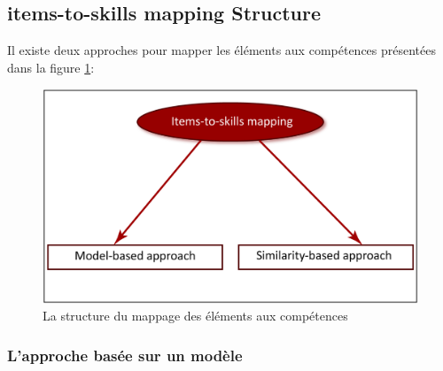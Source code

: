 \subsection{items-to-skills mapping Structure}
Il existe deux approches pour mapper les éléments aux compétences présentées dans la figure \ref{items_to_skills_mapping}:

\begin{figure}[H]
	\begin{center}
		\includegraphics[scale=0.2]{images/chapitre3/Items_mapping_structure.png}
	\end{center}
\caption{La structure du mappage des éléments aux compétences }
\label{items_to_skills_mapping}
\end{figure}

\subsubsection{L’approche basée sur un modèle}
